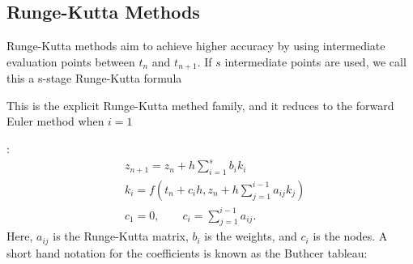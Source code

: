 \documentclass[letterpaper, 11pt]{article}
\providecommand{\note}[1]{\begin{margintable}{\footnotesize #1}\end{margintable}}
\begin{document}
\subsection{Runge-Kutta Methods}
\label{sec-1-3}
Runge-Kutta methods aim to achieve higher accuracy by using intermediate evaluation points between $t_{n}$ and $t_{n+1}$. If $s$ intermediate points are used, we call this a
s-stage Runge-Kutta formula\note{This is the explicit Runge-Kutta methed family, and it reduces to the forward Euler method when $i=1$}:
\begin{subequations}
\label{eq:ivp-rk-s-stage}
\begin{align}
&z_{n+1} = z_{n} + h\sum_{i=1}^{s}b_{i}k_{i} \\
&k_{i} = f \left( t_{n} + c_{i}h, z_{n} + h\sum_{j=1}^{i-1}a_{ij}k_{j} \right) \\
\label{eq:ivp-rk-s-stage-c}
&c_{1} = 0, \qquad c_{i} = \sum_{j=1}^{i-1}a_{ij}.
\end{align}
\end{subequations}
Here, $a_{ij}$ is the Runge-Kutta matrix, $b_{i}$ is the weights, and $c_{i}$ is the nodes. A short hand notation for the coefficients is known as the Buthcer tableau:
\end{document}
